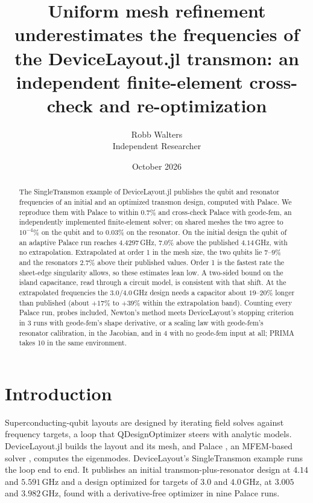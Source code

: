 \documentclass{anvil-paper}
\title{Uniform mesh refinement underestimates the frequencies of the
DeviceLayout.jl transmon: an independent finite-element cross-check and
re-optimization}
\author{Robb Walters\\
  {\normalsize Independent Researcher}}
\date{October 2026}
\begin{document}
\maketitle

\begin{abstract}
The SingleTransmon example of DeviceLayout.jl publishes the qubit and
resonator frequencies of an initial and an optimized transmon design,
computed with Palace. We reproduce them with Palace to within $0.7\%$ and
cross-check Palace with geode-fem, an independently implemented
finite-element solver; on shared meshes the two agree to $10^{-4}\%$ on the
qubit and to $0.03\%$ on the resonator. On the initial design the qubit of an adaptive
Palace run reaches $4.4297$\,GHz, $7.0\%$ above the published $4.14$\,GHz,
with no extrapolation. Extrapolated at order 1 in the mesh size, the two
qubits lie $7$--$9\%$ and the resonators $2.7\%$ above their published
values. Order 1 is the fastest rate the sheet-edge singularity allows, so
these estimates lean low. A two-sided bound on the island capacitance,
read through a circuit model, is consistent with that shift. At the extrapolated frequencies the $3.0$/$4.0$\,GHz design needs a
capacitor about
$19$--$20\%$ longer than published (about $+17\%$ to $+39\%$ within the
extrapolation band). Counting every Palace run, probes included, Newton's method meets
DeviceLayout's stopping criterion in 3 runs with
geode-fem's shape derivative, or a scaling law with geode-fem's resonator
calibration, in the Jacobian, and in 4 with no geode-fem input at all;
PRIMA takes 10 in the same environment.
\end{abstract}

\section{Introduction}
\label{sec:intro}

Superconducting-qubit layouts are designed by iterating field solves
against frequency targets, a loop that QDesignOptimizer
\citep{eriksson2025automated} steers with analytic models. DeviceLayout.jl \citep{devicelayout} builds the layout and
its mesh, and Palace \citep{palace}, an MFEM-based solver \citep{mfem},
computes the eigenmodes. DeviceLayout's SingleTransmon example
\citep{devicelayout-blog,devicelayout-example} runs the loop end to end. It
publishes an initial transmon-plus-resonator design at $4.14$ and
$5.591$\,GHz and a design optimized for targets of $3.0$ and $4.0$\,GHz, at
$3.005$ and $3.982$\,GHz, found with a derivative-free optimizer in nine
Palace runs.
\end{document}
